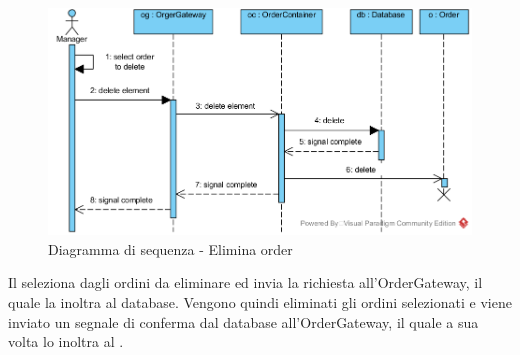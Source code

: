 \begin{figure}[H]
	\centering
	\includegraphics[width=14cm]{diagrammi_img/sequenza/direttore_elimina_orders.png}
	\caption{Diagramma di sequenza - Elimina order}
\end{figure}
Il \Manager{} seleziona dagli ordini da eliminare ed invia la richiesta all'Order\-Gateway, il quale la inoltra al database. Vengono quindi eliminati gli ordini selezionati e viene inviato un segnale di conferma dal database all'Order\-Gateway, il quale a sua volta lo inoltra al \Manager{}.